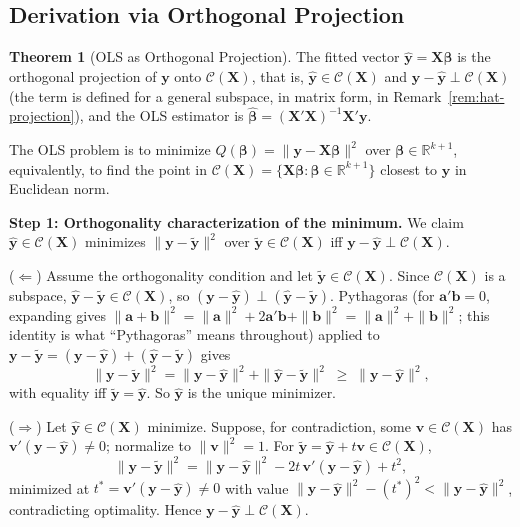 \documentclass[12pt,a4paper]{article}
\makeatletter
\theoremstyle{definition}
\newtheorem{theorem}{Theorem}[section]
\renewenvironment{proof}[1][\proofname]{\par
  \pushQED{\qed}%
  \normalfont \topsep6\p@\@plus6\p@\relax
  \trivlist
  \item[\hskip\labelsep\bfseries #1\@addpunct{.}]\ignorespaces
}{%
  \popQED\endtrivlist\@endpefalse
}
\newcommand{\bX}{\mathbf{X}}
\newcommand{\by}{\mathbf{y}}
\def\bb{\boldsymbol{\beta}}
\newcommand{\bv}{\mathbf{v}}
\newcommand{\Real}{\mathbb{R}}
\newcommand{\calC}{\mathcal{C}}
\makeatother
\begin{document}
\subsection{Derivation via Orthogonal Projection}

\begin{theorem}[OLS as Orthogonal Projection]\label{thm:ols-proj}
The fitted vector $\hat{\by} = \bX\hat{\bb}$ is the orthogonal projection of $\by$ onto $\calC(\bX)$, that is, $\hat{\by} \in \calC(\bX)$ and $\by - \hat{\by} \perp \calC(\bX)$ (the term is defined for a general subspace, in matrix form, in Remark~\ref{rem:hat-projection}), and the OLS estimator is $\hat{\bb} = (\bX'\bX)^{-1}\bX'\by$.
\end{theorem}

\begin{proof}
The OLS problem is to minimize $Q(\bb) = \|\by - \bX\bb\|^2$ over $\bb \in \Real^{k+1}$, equivalently, to find the point in $\calC(\bX) = \{\bX\bb : \bb \in \Real^{k+1}\}$ closest to $\by$ in Euclidean norm.

\textbf{Step 1: Orthogonality characterization of the minimum.} We claim $\hat{\by} \in \calC(\bX)$ minimizes $\|\by - \tilde{\by}\|^2$ over $\tilde{\by} \in \calC(\bX)$ iff $\by - \hat{\by} \perp \calC(\bX)$.

($\Leftarrow$) Assume the orthogonality condition and let $\tilde{\by} \in \calC(\bX)$. Since $\calC(\bX)$ is a subspace, $\hat{\by} - \tilde{\by} \in \calC(\bX)$, so $(\by - \hat{\by}) \perp (\hat{\by} - \tilde{\by})$. Pythagoras (for $\mathbf{a}'\mathbf{b} = 0$, expanding gives $\|\mathbf{a} + \mathbf{b}\|^2 = \|\mathbf{a}\|^2 + 2\mathbf{a}'\mathbf{b} + \|\mathbf{b}\|^2 = \|\mathbf{a}\|^2 + \|\mathbf{b}\|^2$; this identity is what ``Pythagoras'' means throughout) applied to $\by - \tilde{\by} = (\by - \hat{\by}) + (\hat{\by} - \tilde{\by})$ gives
\[
\|\by - \tilde{\by}\|^2 = \|\by - \hat{\by}\|^2 + \|\hat{\by} - \tilde{\by}\|^2 \;\geqslant\; \|\by - \hat{\by}\|^2,
\]
with equality iff $\tilde{\by} = \hat{\by}$. So $\hat{\by}$ is the unique minimizer.

($\Rightarrow$) Let $\hat{\by} \in \calC(\bX)$ minimize. Suppose, for contradiction, some $\bv \in \calC(\bX)$ has $\bv'(\by - \hat{\by}) \neq 0$; normalize to $\|\bv\|^2 = 1$. For $\tilde{\by} = \hat{\by} + t\bv \in \calC(\bX)$,
\[
\|\by - \tilde{\by}\|^2 = \|\by - \hat{\by}\|^2 - 2t\,\bv'(\by - \hat{\by}) + t^2,
\]
minimized at $t^* = \bv'(\by - \hat{\by}) \neq 0$ with value $\|\by - \hat{\by}\|^2 - (t^*)^2 < \|\by - \hat{\by}\|^2$, contradicting optimality. Hence $\by - \hat{\by} \perp \calC(\bX)$.


\end{proof}
\end{document}
